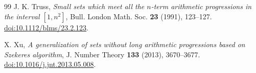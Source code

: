 \documentclass[11pt]{article}
\theoremstyle{remark}
\numberwithin{equation}{section}
\begin{document}
\begin{thebibliography}{99}
J. K. Truss,
\emph{Small sets which meet all the $n$-term arithmetic progressions in the interval $[1,n^2]$},
Bull. London Math. Soc. \textbf{23} (1991), 123--127.
\href{https://doi.org/10.1112/blms/23.2.123}{doi:10.1112/blms/23.2.123}.

X. Xu,
\emph{A generalization of sets without long arithmetic progressions based on Szekeres algorithm},
J. Number Theory \textbf{133} (2013), 3670--3677.
\href{https://doi.org/10.1016/j.jnt.2013.05.008}{doi:10.1016/j.jnt.2013.05.008}.

\end{thebibliography}
\end{document}
